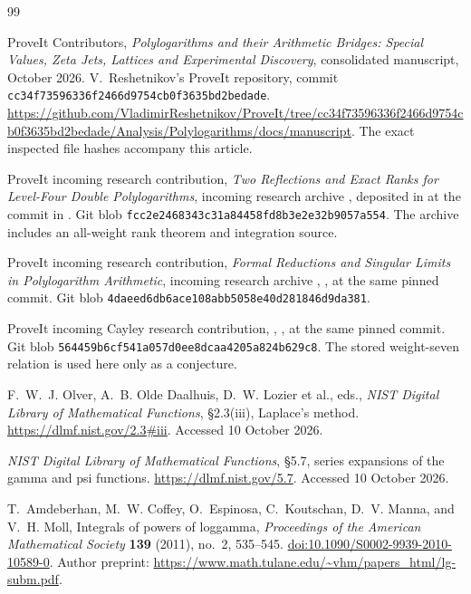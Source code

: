 \begin{thebibliography}{99}
\small
\raggedright

ProveIt Contributors, \emph{Polylogarithms and their Arithmetic
Bridges: Special Values, Zeta Jets, Lattices and Experimental
Discovery}, consolidated manuscript, October 2026.
V.~Reshetnikov's ProveIt repository, commit
\texttt{cc34f73596336f2466d9754cb0f3635bd2bedade}.
\url{https://github.com/VladimirReshetnikov/ProveIt/tree/cc34f73596336f2466d9754cb0f3635bd2bedade/Analysis/Polylogarithms/docs/manuscript}.
The exact inspected file hashes accompany this article.

ProveIt incoming research contribution,
\emph{Two Reflections and Exact Ranks for Level-Four Double Polylogarithms},
incoming research archive
, deposited in
 at the commit in \cite{cont:ProveIt}.
Git blob \texttt{fcc2e2468343c31a84458fd8b3e2e32b9057a554}.
The archive includes an all-weight rank theorem and integration source.

ProveIt incoming research contribution,
\emph{Formal Reductions and Singular Limits in Polylogarithm Arithmetic},
incoming research archive
,
, at the same pinned commit.
Git blob \texttt{4daeed6db6ace108abb5058e40d281846d9da381}.

ProveIt incoming Cayley research contribution,
, ,
at the same pinned commit.
Git blob \texttt{564459b6cf541a057d0ee8dcaa4205a824b629c8}.
The stored weight-seven relation is used here only as a conjecture.

F.~W.~J. Olver, A.~B. Olde Daalhuis, D.~W. Lozier et al., eds.,
\emph{NIST Digital Library of Mathematical Functions},
\S2.3(iii), Laplace's method.
\url{https://dlmf.nist.gov/2.3#iii}. Accessed 10 October 2026.

\emph{NIST Digital Library of Mathematical Functions},
\S5.7, series expansions of the gamma and psi functions.
\url{https://dlmf.nist.gov/5.7}. Accessed 10 October 2026.

T.~Amdeberhan, M.~W. Coffey, O.~Espinosa, C.~Koutschan,
D.~V. Manna, and V.~H. Moll, Integrals of powers of loggamma,
\emph{Proceedings of the American Mathematical Society}
\textbf{139} (2011), no.~2, 535--545.
\href{https://doi.org/10.1090/S0002-9939-2010-10589-0}{doi:10.1090/S0002-9939-2010-10589-0}.
Author preprint:
\url{https://www.math.tulane.edu/~vhm/papers_html/lg-subm.pdf}.


\end{thebibliography}
